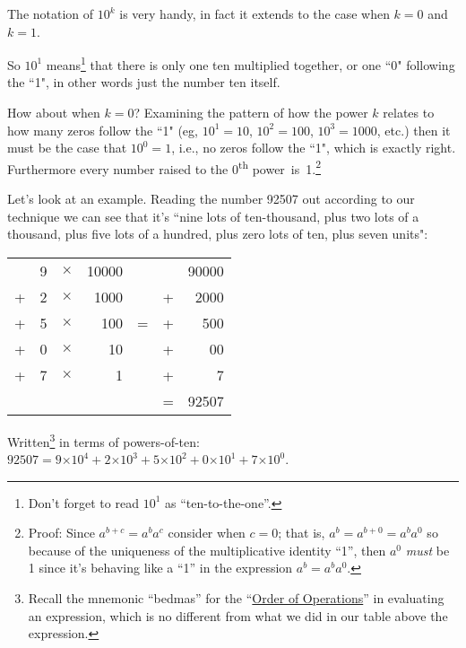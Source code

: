 \documentclass{article}
\begin{document}
The notation of $10^k$ is very handy, in fact it extends
to the case when $k=0$ and $k=1$.

So $10^1$ means\footnote{Don't forget to read $10^1$
as ``ten-to-the-one''.} that there is only one ten multiplied together,
or one ``0" following the ``1",
in other words just the number ten itself.

How about when $k=0$?
Examining the pattern of how the power $k$ relates to how many zeros follow the ``1"
(eg, $10^1=10$, $10^2=100$, $10^3=1000$,
etc.) then it must be the case that $10^0=1$,
i.e., no zeros follow the ``1", which is exactly right.
Furthermore every number raised to the 0\textsuperscript{th}
power~is~1.\footnote{Proof: Since $a^{b+c}=a^ba^c$ consider when $c=0$; that is,
$a^b=a^{b+0}=a^ba^0$ so because of the uniqueness
of the multiplicative identity ``1'', then $a^0$ \emph{must} be 1 since it's behaving 
like a ``1'' in the expression $a^b=a^ba^0$.}

Let's look at an example.
Reading the number 92507 out according to our technique we can see
that it's ``nine lots of ten-thousand,
plus two lots of a thousand, plus five lots of a hundred,
plus zero lots of ten, plus seven units":

\begin{center}
\begin{tabular}{r r r r c r r}
\phantom & 9 & $\times$ & 10000 & \phantom & \phantom & 90000\\
+ & 2 & $\times$ & 1000 & \phantom & + & 2000\\
+ & 5 & $\times$ & 100 & \; \; \; = \; \; \; & + & 500\\
+ & 0 & $\times$ & 10 & \phantom & + & 00\\
+ & 7 & $\times$ & 1 & \phantom & + & 7\\
\cline{6-7}
\phantom & \phantom & \phantom & \phantom & \phantom & = & 92507
\end{tabular}
\end{center}

Written\footnote{Recall the mnemonic ``bedmas'' for
the ``\href{https://en.wikipedia.org/wiki/Order_of_operations}{Order of Operations}'' in
evaluating an expression, which is no different from
what we did in our table above the expression.}
in terms of powers-of-ten:
$92507=9{\times{}}10^4+2{\times{}}10^3+5{\times{}}10^2+0{\times{}}10^1+7{\times{}}10^0$.
\end{document}
